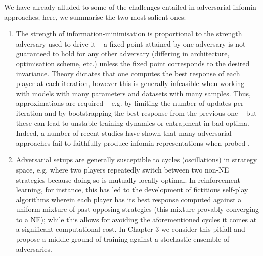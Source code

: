 We have already alluded to some of the challenges entailed in adversarial infomin
approaches; here, we summarise the two most salient ones:
%
\begin{enumerate}
        \item The strength of information-minimisation is proportional to the strength adversary
          used to drive it -- a fixed point attained by one adversary  is not guaranteed to hold
          for any other adversary (differing in architecture, optimisation scheme, etc.) unless the
          fixed point corresponds to the desired invariance. 
          Theory dictates that one computes the best response of each player at each iteration,
          however this is generally infeasible when working with models with many parameters and
          datasets with many samples. 
          Thus, approximations are required -- e.g. by limiting the number of updates per iteration
          and by bootstrapping the best response from the previous one -- but these can lead to
          unstable training dynamics or entrapment in bad optima. 
          Indeed, a number of recent studies have shown that many adversarial approaches fail to
          faithfully produce infomin representations when probed \citep{moyer2018invariant,
          feng2019learning, balunovic2021fair}.
        \item Adversarial setups are generally susceptible to cycles (oscillations) in strategy
          space, e.g. where two players repeatedly switch between two non-NE strategies because
          doing so is mutually locally optimal. 
          In reinforcement learning, for instance, this has led to the development of fictitious
          self-play algorithms \citep{brown1951iterative, heinrich2015fictitious,
          vinyals2019grandmaster} wherein each player has its best response computed against a
          uniform mixture of past opposing strategies (this mixture provably converging to a NE);
          while this allows for avoiding the aforementioned cycles it comes at a significant
          computational cost.
          In Chapter 3 we consider this pitfall and propose a middle ground of training against a
          stochastic ensemble of adversaries.
\end{enumerate}



